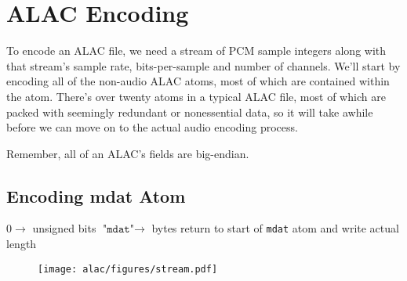 
\section{ALAC Encoding}

To encode an ALAC file, we need a stream of PCM sample integers
along with that stream's sample rate, bits-per-sample and number of
channels.
We'll start by encoding all of the non-audio ALAC atoms,
most of which are contained within the  atom.
There's over twenty atoms in a typical ALAC file,
most of which are packed with seemingly redundant or
nonessential data,
so it will take awhile before we can move on to the actual
audio encoding process.

Remember, all of an ALAC's fields are big-endian.



\clearpage

\subsection{Encoding mdat Atom}
$0 \rightarrow$  unsigned bits
$\texttt{"mdat"} \rightarrow$  bytes\;
return to start of \texttt{mdat} atom and write actual length\;
\EALGORITHM
\begin{figure}[h]
\texttt{[image: alac/figures/stream.pdf]}
\end{figure}

